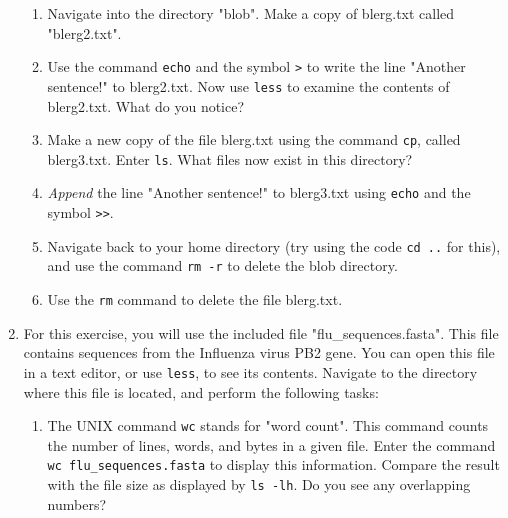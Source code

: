 \documentclass{article}[12pt]
\newcommand{\code}[1]{\texttt{#1}}  %
\begin{document}
\begin{enumerate}[itemsep=5ex]
\begin{enumerate}[itemsep=2ex]
		\item Navigate into the directory "blob". Make a copy of blerg.txt called "blerg2.txt".
		
		\item Use the command \code{echo} and the symbol \code{>} to write the line "Another sentence!" to blerg2.txt. Now use \code{less} to examine the contents of blerg2.txt. What do you notice?
		
		\item Make a new copy of the file blerg.txt using the command \code{cp}, called blerg3.txt. Enter \code{ls}. What files now exist in this directory?
		
		\item \emph{Append} the line "Another sentence!" to blerg3.txt using \code{echo} and the symbol \code{>>}. 
		
		\item Navigate back to your home directory (try using the code \code{cd ..} for this), and use the command \code{rm -r} to delete the blob directory.	
	
		\item Use the \code{rm} command to delete the file blerg.txt.
	\end{enumerate} 
	
%			
%			
	
	
	\item For this exercise, you will use the included file "flu\_sequences.fasta". This file contains sequences from the Influenza virus PB2 gene. You can open this file in a text editor, or use \code{less}, to see its contents. Navigate to the directory where this file is located, and perform the following tasks:
	\begin{enumerate}[itemsep=2ex]
		\item The UNIX command \code{wc} stands for "word count". This command counts the number of lines, words, and bytes in a given file. Enter the command \code{wc flu\_sequences.fasta} to display this information. Compare the result with the file size as displayed by \code{ls -lh}. Do you see any overlapping numbers?
		

\end{enumerate}
\end{enumerate}
\end{document}
